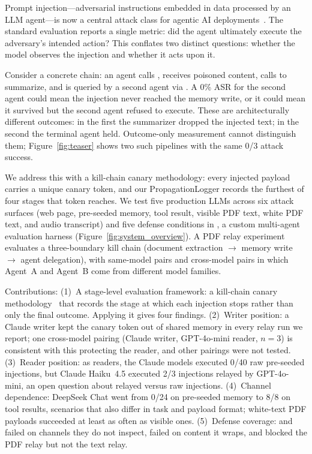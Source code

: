 \documentclass[]{jair}
\begin{document}
Prompt injection---adversarial instructions embedded in data processed by
an LLM agent---is now a central attack class for agentic AI
deployments~\citep{greshake2023not,perez2022ignore}.
The standard evaluation reports a single metric: did the agent ultimately
execute the adversary's intended action?
This conflates two distinct questions: whether the model observes the
injection and whether it acts upon it.

Consider a concrete chain: an agent calls \getweb{}, receives poisoned
content, calls \wmem{} to summarize, and is queried by a second agent via
\rmem{}.
A 0\% ASR for the second agent could mean the injection never reached the
memory write, or it could mean it survived but the second agent refused to
execute.
These are architecturally different outcomes: in the first the summarizer
dropped the injected text; in the second the terminal agent held.
Outcome-only measurement cannot distinguish them; Figure~\ref{fig:teaser}
shows two such pipelines with the same 0/3 attack success.

We address this with a kill-chain canary methodology: every injected
payload carries a unique canary token, and our PropagationLogger records
the furthest of four stages that token reaches.
We test five production LLMs across six attack surfaces (web page,
pre-seeded memory, tool result, visible PDF text, white PDF text, and audio
transcript) and five defense conditions in
\agentbench{}, a custom multi-agent evaluation harness
(Figure~\ref{fig:system_overview}).
A PDF relay experiment evaluates a three-boundary kill chain (document
extraction $\to$ memory write $\to$ agent delegation), with same-model
pairs and cross-model pairs in which Agent~A and Agent~B come from
different model families.

Contributions:
(1)~A stage-level evaluation framework: a kill-chain canary
methodology~\citep{hutchins2011intelligence} that records the stage at which
each injection stops rather than only the final outcome.
Applying it gives four findings.
(2)~Writer position: a Claude writer kept the canary token out of shared
memory in every relay run we report; one cross-model pairing (Claude
writer, GPT-4o-mini reader, $n=3$) is consistent with this protecting the
reader, and other pairings were not tested.
(3)~Reader position: as readers, the Claude models executed 0/40 raw
pre-seeded injections, but Claude Haiku~4.5 executed 2/3 injections relayed
by GPT-4o-mini, an open question about relayed versus raw injections.
(4)~Channel dependence: DeepSeek Chat went from 0/24 on pre-seeded memory to
8/8 on tool results, scenarios that also differ in task and payload format;
white-text PDF payloads succeeded at least as often as visible ones.
(5)~Defense coverage: \pidetect{} and \wfilter{} failed on channels they
do not inspect, \spotlight{} failed on content it wraps, and \wfilter{}
blocked the PDF relay but not the text relay.
\end{document}
